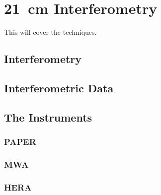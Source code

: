 \chapter{21\ cm Interferometry}
\label{ch2}

This will cover the techniques.

\section{Interferometry}

\section{Interferometric Data}

\section{The Instruments}

\subsection{PAPER}
\subsection{MWA}
\subsection{HERA}
